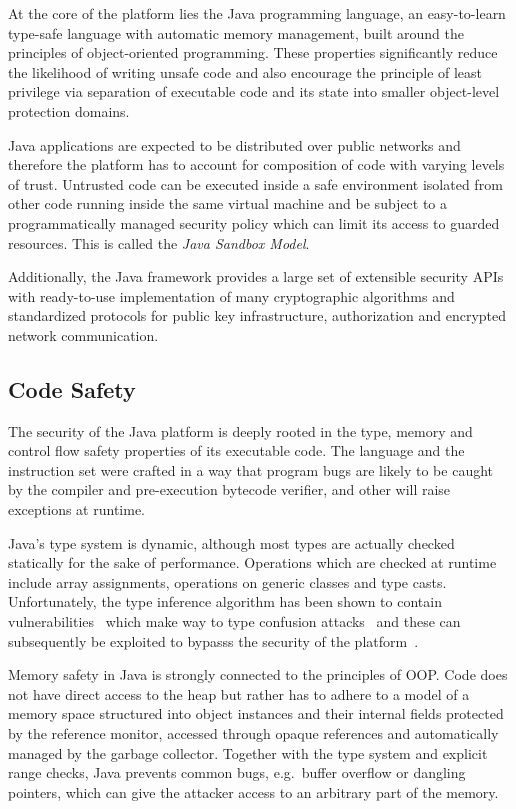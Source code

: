 \documentclass[a4paper,12pt,twoside,openright]{report}
\begin{document}
At the core of the platform lies the Java programming language, an easy-to-learn type-safe language with automatic memory management, built around the principles of object-oriented programming. These properties significantly reduce the likelihood of writing unsafe code and also encourage the principle of least privilege via separation of executable code and its state into smaller object-level protection domains.

Java applications are expected to be distributed over public networks and therefore the platform has to account for composition of code with varying levels of trust. Untrusted code can be executed inside a safe environment isolated from other code running inside the same virtual machine and be subject to a programmatically managed security policy which can limit its access to guarded resources. This is called the \emph{Java Sandbox Model}.

Additionally, the Java framework provides a large set of extensible security APIs with ready-to-use implementation of many cryptographic algorithms and standardized protocols for public key infrastructure, authorization and encrypted network communication. 

\subsection{Code Safety}

The security of the Java platform is deeply rooted in the type, memory and control flow safety properties of its executable code. The language and the instruction set were crafted in a way that program bugs are likely to be caught by the compiler and pre-execution bytecode verifier, and other will raise exceptions at runtime. 

\label{section:TypeConfusion}
Java's type system is dynamic, although most types are actually checked statically for the sake of performance. Operations which are checked at runtime include array assignments, operations on generic classes and type casts. Unfortunately, the type inference algorithm has been shown to contain vulnerabilities~\cite{Suenaga:2012:JavaVulnerability} which make way to type confusion attacks~\cite{Oh:2012:JavaExploitReport} and these can subsequently be exploited to bypasss the security of the platform~\cite{McGraw:1999:SJG:298616}.

Memory safety in Java is strongly connected to the principles of OOP. Code does not have direct access to the heap but rather has to adhere to a model of a memory space structured into object instances and their internal fields protected by the reference monitor, accessed through opaque references and automatically managed by the garbage collector. Together with the type system and explicit range checks, Java prevents common bugs, e.g.\ buffer overflow or dangling pointers, which can give the attacker access to an arbitrary part of the memory.
\end{document}
